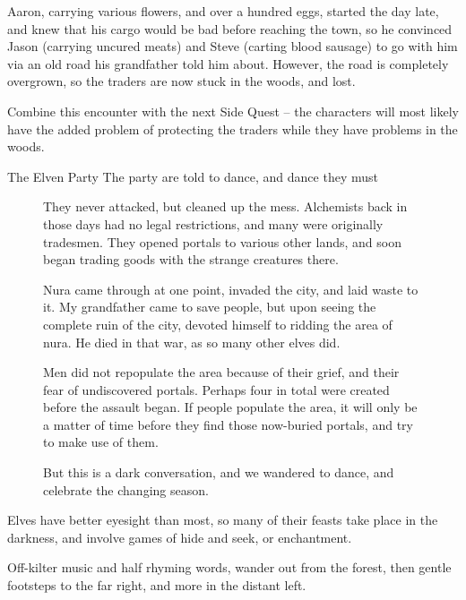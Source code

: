 \begin{multicols}{2}
Aaron, carrying various flowers, and over a hundred eggs, started the day late, and knew that his cargo would be bad before reaching the town, so he convinced Jason (carrying uncured meats) and Steve (carting blood sausage) to go with him via an old road his grandfather told him about.
However, the road is completely overgrown, so the traders are now stuck in the woods, and lost.

Combine this encounter with the next Side Quest -- the characters will most likely have the added problem of protecting the traders while they have problems in the woods.


{The Elven Party}%
{The party are told to dance, and dance they must}%

\begin{figure*}[b]
\begin{speechtext}

	They never attacked, but cleaned up the mess.  Alchemists back in those days had no legal restrictions, and many were originally tradesmen.  They opened portals to various other lands, and soon began trading goods with the strange creatures there.

	Nura came through at one point, invaded the city, and laid waste to it.  My grandfather came to save people, but upon seeing the complete ruin of the city, devoted himself to ridding the area of nura.  He died in that war, as so many other elves did.

	Men did not repopulate the area because of their grief, and their fear of undiscovered portals.
	Perhaps four in total were created before the assault began.
	If people populate the area, it will only be a matter of time before they find those now-buried portals, and try to make use of them.

	But this is a dark conversation, and we wandered to dance, and celebrate the changing season.

\end{speechtext}
\end{figure*}

Elves have better eyesight than most, so many of their feasts take place in the darkness, and involve games of hide and seek, or enchantment.

\begin{boxtext}

	Off-kilter music and half rhyming words, wander out from the forest, then gentle footsteps to the far right, and more in the distant left.


\end{boxtext}
\end{multicols}
